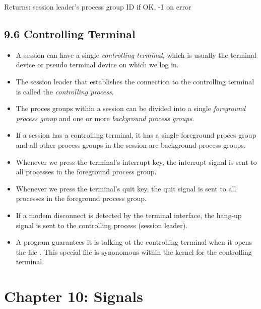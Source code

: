 \documentclass[]{article}
\begin{document}


Returns: session leader's process group ID if OK, -1 on error

\subsection*{9.6 Controlling Terminal}
\begin{itemize}
\item A session can have a single \emph{controlling terminal}, which is usually
the terminal device or pseudo terminal device on which we log in.
\item The session leader that establishes the connection to the controlling
terminal is called the \emph{controlling process}.
\item The proces groups within a session can be divided into a single
\emph{foreground process group} and one or more \emph{background process
groups}.
\item If a session has a controlling terminal, it has a single foreground proces
group and all other process groups in the session are background process groups.
\item Whenever we press the terminal's interrupt key, the interrupt signal is
sent to all processes in the foreground process group.
\item Whenever we press the terminal's quit key, the quit signal is sent to all
processes in the foreground process group.
\item If a modem disconnect is detected by the terminal interface, the hang-up
signal is sent to the controlling process (session leader).
\item A program guarantees it is talking ot the controlling terminal when it
opens the file . This special file is synonomous within the
kernel for the controlling terminal.
\end{itemize}

\section*{Chapter 10: Signals}
\end{document}
